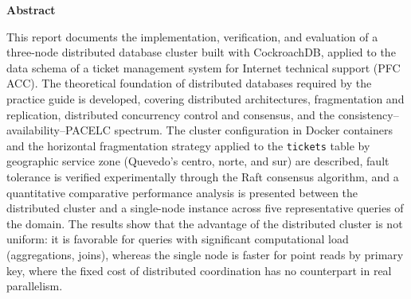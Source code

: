 \documentclass[11pt,a4paper]{article}
\begin{document}
\begin{abstract}
Este informe documenta la implementaci\'on, verificaci\'on y evaluaci\'on de un
cl\'uster de base de datos distribuida de tres nodos con CockroachDB, aplicado
al esquema de datos del sistema de gesti\'on de solicitudes de soporte t\'ecnico
de Internet (PFC ACC). Se desarrolla el fundamento te\'orico de bases de datos
distribuidas exigido por la gu\'ia (arquitecturas, fragmentaci\'on y
replicaci\'on, control de concurrencia y consenso, y el espectro de
consistencia, disponibilidad y PACELC), se describe la configuraci\'on del
cl\'uster en contenedores Docker y la estrategia de fragmentaci\'on horizontal
de la tabla \texttt{tickets} por zona geogr\'afica de atenci\'on
(centro, norte y sur de Quevedo), se verifica experimentalmente la
tolerancia a fallos mediante el algoritmo de consenso Raft, y se presenta un
an\'alisis comparativo cuantitativo de rendimiento entre el cl\'uster
distribuido y una instancia de nodo \'unico sobre cinco consultas
representativas del dominio. Los resultados muestran que la ventaja del
cl\'uster distribuido no es uniforme: resulta favorable en consultas con
carga de c\'omputo significativa (agregaciones, \emph{joins}), mientras que
el nodo \'unico es m\'as r\'apido en lecturas puntuales por clave primaria,
donde el costo fijo de coordinaci\'on distribuida no tiene contrapartida en
paralelismo real.
\end{abstract}

\begin{center}
\textbf{Abstract}
\end{center}

\noindent This report documents the implementation, verification, and
evaluation of a three-node distributed database cluster built with
CockroachDB, applied to the data schema of a ticket management system for
Internet technical support (PFC ACC). The theoretical foundation of
distributed databases required by the practice guide is developed,
covering distributed architectures, fragmentation and replication,
distributed concurrency control and consensus, and the
consistency--availability--PACELC spectrum. The cluster configuration in
Docker containers and the horizontal fragmentation strategy applied to the
\texttt{tickets} table by geographic service zone (Quevedo's centro, norte,
and sur) are described, fault tolerance is verified experimentally through
the Raft consensus algorithm, and a quantitative comparative performance
analysis is presented between the distributed cluster and a single-node
instance across five representative queries of the domain. The results
show that the advantage of the distributed cluster is not uniform: it is
favorable for queries with significant computational load (aggregations,
joins), whereas the single node is faster for point reads by primary key,
where the fixed cost of distributed coordination has no counterpart in
real parallelism.
\end{document}
